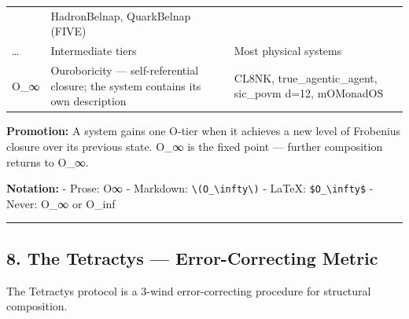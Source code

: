 \documentclass[12pt,a4paper]{article}
\begin{document}
\begin{longtable}[]{@{}lll@{}}
\begin{minipage}[t]{0.42\columnwidth}
\end{minipage} & \begin{minipage}[t]{0.29\columnwidth}\raggedright
HadronBelnap, QuarkBelnap (FIVE)\strut
\end{minipage}\tabularnewline
\begin{minipage}[t]{0.20\columnwidth}\raggedright
\ldots{}\strut
\end{minipage} & \begin{minipage}[t]{0.42\columnwidth}\raggedright
Intermediate tiers\strut
\end{minipage} & \begin{minipage}[t]{0.29\columnwidth}\raggedright
Most physical systems\strut
\end{minipage}\tabularnewline
\begin{minipage}[t]{0.20\columnwidth}\raggedright
O\_∞\strut
\end{minipage} & \begin{minipage}[t]{0.42\columnwidth}\raggedright
Ouroboricity --- self-referential closure; the system contains its own
description\strut
\end{minipage} & \begin{minipage}[t]{0.29\columnwidth}\raggedright
CL8NK, true\_agentic\_agent, sic\_povm d=12, mOMonadOS\strut
\end{minipage}\tabularnewline
\bottomrule
\end{longtable}

\textbf{Promotion:} A system gains one O-tier when it achieves a new
level of Frobenius closure over its previous state. O\_∞ is the fixed
point --- further composition returns to O\_∞.

\textbf{Notation:} - Prose: O∞ - Markdown:
\texttt{\textbackslash{}(O\_\textbackslash{}infty\textbackslash{})} -
LaTeX: \texttt{\$O\_\textbackslash{}infty\$} - Never: O\_∞ or O\_inf

\begin{center}\rule{0.5\linewidth}{0.5pt}\end{center}

\hypertarget{the-tetractys-error-correcting-metric}{%
\subsection{8. The Tetractys --- Error-Correcting
Metric}\label{the-tetractys-error-correcting-metric}}

The Tetractys protocol is a 3-wind error-correcting procedure for
structural composition.
\end{document}
